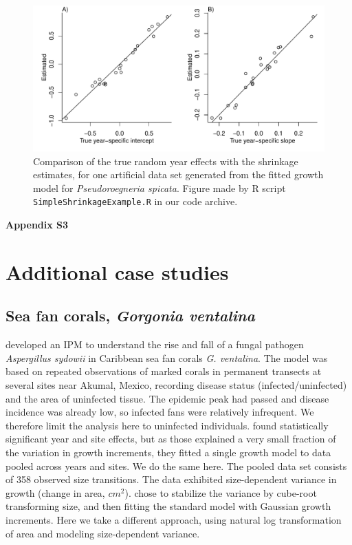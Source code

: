 \documentclass[12pt]{article}
\begin{document}
\begin{spacing}{1.35}
	\begin{figure}[tbp]
		\centerline{\includegraphics[width=\textwidth]{figures/SimpleShrinkage.pdf}}
		\caption{Comparison of the true random year effects with the shrinkage estimates, for one artificial data set
			generated from the fitted growth model for  \emph{Pseudoroegneria spicata}. Figure made by R script 
			\texttt{SimpleShrinkageExample.R} in our code archive.} 
		\label{fig:compareShrinkage}
	\end{figure}
	
	\newpage
	\linenumbers
	\centerline{\Large{\textbf{Appendix S3}}}
	\renewcommand{\thetable}{S-\arabic{table}}
	\renewcommand{\thefigure}{S-\arabic{figure}}
	\renewcommand{\thesection}{S.\arabic{section}}
	\renewcommand{\theequation}{S\arabic{equation}}
	\setcounter{page}{1}
	\setcounter{equation}{0}
	\setcounter{figure}{0}
	\setcounter{section}{0}
	\setcounter{table}{0}
	\section{Additional case studies}
	\label{sec:moreCases}
	
	\subsection{Sea fan corals, \emph{Gorgonia ventalina}}
	\label{sec:seafans}
	\cite{bruno-etal-2011} developed an IPM to understand the rise and fall of a fungal pathogen \emph{Aspergillus sydowii} in Caribbean sea fan corals \emph{G. ventalina}. 
	The model was based on repeated observations of marked corals in permanent transects at several sites near Akumal, Mexico, recording disease status (infected/uninfected) and the area of uninfected tissue. 
	The epidemic peak had passed and disease incidence was already low, so infected fans were relatively infrequent. 
	We therefore limit the analysis here to uninfected individuals.
	\citet{bruno-etal-2011} found statistically significant year and site effects, but as those explained a very small fraction of the variation in growth increments, they fitted a single growth model to data pooled across years and sites. 
	We do the same here. 
	The pooled data set consists of 358 observed size transitions. 
	The data exhibited size-dependent variance in growth (change in area, $cm^2$).  
	\cite{bruno-etal-2011} chose to stabilize the variance by cube-root transforming size, and then fitting the standard model with Gaussian growth increments. 
	Here we take a different approach, using natural log transformation of area and modeling size-dependent variance. 
	

\end{spacing}
\end{document}
